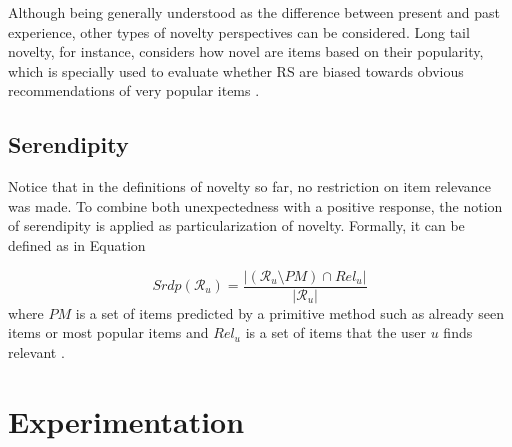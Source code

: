 Although being generally understood as the difference between present and past experience, other types of novelty perspectives can be considered. Long tail novelty, for instance, considers how novel are items based on their popularity, which is specially used to evaluate whether RS are biased towards obvious recommendations of very popular items \cite{2014NoveltyDiversityEnhancement}.

\subsection{Serendipity}

Notice that in the definitions of novelty so far, no restriction on item relevance was made. To combine both unexpectedness with a positive response, the notion of serendipity is applied as particularization of novelty. Formally, it can be defined as in Equation 

\begin{equation}
    \label{eq:serendipity}
    Srdp(\mathcal{R}_u) = \frac{|(\mathcal{R}_u \setminus PM) \cap Rel_u|}{|\mathcal{R}_u|}
\end{equation} where $PM$ is a set of items predicted by a primitive method such as already seen items or most popular items and $Rel_u$ is a set of items that the user $u$ finds relevant \cite{2014NoveltyDiversityEnhancement}.


\section{Experimentation}


